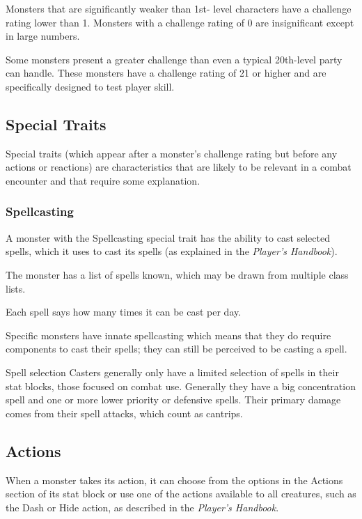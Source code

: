Monsters that are significantly weaker than 1st- level characters have a challenge rating lower than 1. Monsters with a challenge rating of 0 are insignificant except in large numbers.

Some monsters present a greater challenge than even a typical 20th-level party can handle. These monsters have a challenge rating of 21 or higher and are specifically designed to test player skill.

\subsection{Special Traits}

Special traits (which appear after a monster's challenge rating but before any actions or reactions) are characteristics that are likely to be relevant in a combat encounter and that require some explanation.

\subsubsection{Spellcasting}

A monster with the Spellcasting special trait has the ability to cast selected spells, which it uses to cast its spells (as explained in the \textit{Player's Handbook}).

The monster has a list of spells known, which may be drawn from multiple class lists.

Each spell says how many times it can be cast per day.

Specific monsters have innate spellcasting which means that they do require components to cast their spells; they can still be perceived to be casting a spell.

\begin{DndComment}{Spell selection}
    Casters generally only have a limited selection of spells in their stat blocks, those focused on combat use. Generally they have a big concentration spell and one or more lower priority or defensive spells. Their primary damage comes from their spell attacks, which count as cantrips. 
\end{DndComment}
 
\subsection{Actions}

When a monster takes its action, it can choose from the options in the Actions section of its stat block or use one of the actions available to all creatures, such as the Dash or Hide action, as described in the \textit{Player's Handbook}.

